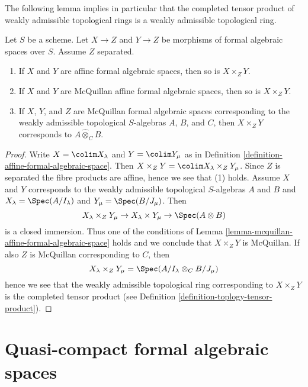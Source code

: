 \noindent
The following lemma implies in particular that the completed
tensor product of weakly admissible topological rings is
a weakly admissible topological ring.

\begin{lemma}
\label{lemma-fibre-product-affines-over-separated}
Let $S$ be a scheme. Let $X \to Z$ and $Y \to Z$ be morphisms
of formal algebraic spaces over $S$. Assume $Z$ separated.
\begin{enumerate}
\item If $X$ and $Y$ are affine formal algebraic spaces, then
so is $X \times_Z Y$.
\item If $X$ and $Y$ are McQuillan affine formal algebraic spaces, then
so is $X \times_Z Y$.
\item If $X$, $Y$, and $Z$ are McQuillan formal algebraic spaces
corresponding to the weakly admissible topological $S$-algebras
$A$, $B$, and $C$, then $X \times_Z Y$ corresponds to
$A \widehat\otimes_C B$.
\end{enumerate}
\end{lemma}

\begin{proof}
Write $X = \colim X_\lambda$ and $Y = \colim Y_\mu$ as
in Definition \ref{definition-affine-formal-algebraic-space}.
Then $X \times_Z Y = \colim X_\lambda \times_Z Y_\mu$.
Since $Z$ is separated the fibre products are affine, hence
we see that (1) holds. Assume $X$ and $Y$ corresponds to
the weakly admissible topological $S$-algebras $A$ and $B$
and $X_\lambda = \Spec(A/I_\lambda)$ and $Y_\mu = \Spec(B/J_\mu)$.
Then
$$
X_\lambda \times_Z Y_\mu \to
X_\lambda \times Y_\mu \to \Spec(A \otimes B)
$$
is a closed immersion. Thus one of the conditions of
Lemma \ref{lemma-mcquillan-affine-formal-algebraic-space}
holds and we conclude that $X \times_Z Y$ is McQuillan.
If also $Z$ is McQuillan corresponding to $C$, then
$$
X_\lambda \times_Z Y_\mu = \Spec(A/I_\lambda \otimes_C B/J_\mu)
$$
hence we see that the weakly admissible topological ring
corresponding to $X \times_Z Y$ is the completed tensor product
(see Definition \ref{definition-toplogy-tensor-product}).
\end{proof}





\section{Quasi-compact formal algebraic spaces}
\label{section-quasi-compact}

